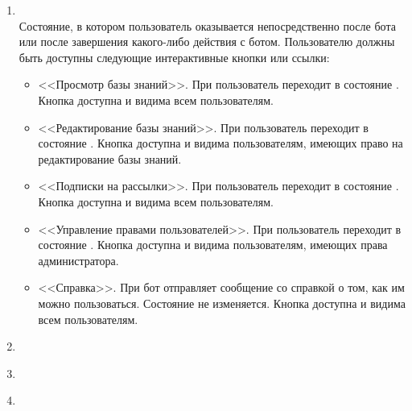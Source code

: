 \begin{enumerate}
            \item \label{itm:req:ui:states:mainmenu}
                 \\
                Состояние, в котором пользователь оказывается непосредственно после 
                бота или после завершения какого-либо действия с ботом. Пользователю должны быть доступны
                следующие интерактивные кнопки или ссылки:
                \begin{itemize}
                    \item
                        <<Просмотр базы знаний>>.
                        При  пользователь переходит в состояние
                        \hyperref[itm:req:ui:states:navx]
                        {}.
                        Кнопка доступна и видима всем пользователям.
                    \item
                        <<Редактирование базы знаний>>.
                        При  пользователь переходит в состояние
                        \hyperref[itm:req:ui:states:navx]
                        {}.
                        Кнопка доступна и видима пользователям, имеющих право на редактирование базы знаний.
                    \item
                        <<Подписки на рассылки>>.
                        При  пользователь переходит в состояние
                        \hyperref[itm:req:ui:states:subscriptions]
                        {}.
                        Кнопка доступна и видима всем пользователям.
                    \item
                        <<Управление правами пользователей>>.
                        При  пользователь переходит в состояние
                        \hyperref[itm:req:ui:states:privs]
                        {}.
                        Кнопка доступна и видима пользователям, имеющих права администратора.
                    \item
                        <<Справка>>.
                        При  бот отправляет сообщение со справкой о том,
                        как им можно пользоваться. Состояние не изменяется.
                        Кнопка доступна и видима всем пользователям.
                \end{itemize}

            \item \label{itm:req:ui:states:navx}

            \item \label{itm:req:ui:states:subscriptions}

            \item \label{itm:req:ui:states:privs}
        \end{enumerate}
        \endgroup


